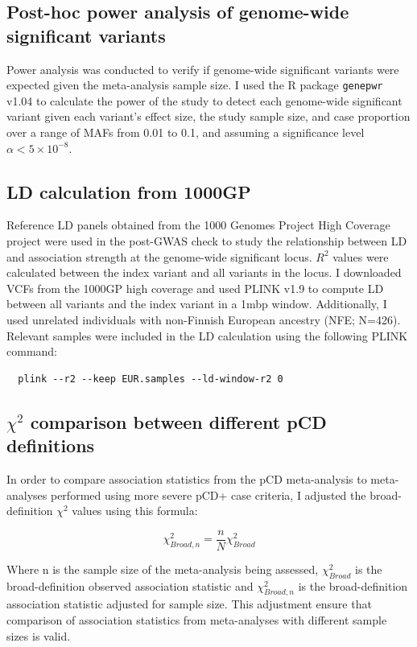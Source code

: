 \subsection{Post-hoc power analysis of genome-wide significant variants}
Power analysis was conducted to verify if genome-wide significant variants were expected given the meta-analysis sample size. I used the R package \Verb+genepwr+ v1.04 \cite{genepwr-docs} to calculate the power of the study to detect each genome-wide significant variant given each variant's effect size, the study sample size, and case proportion over a range of MAFs from 0.01 to 0.1, and assuming a significance level $\alpha < 5\times10^{-8}$.


\subsection{LD calculation from 1000GP}
Reference LD panels obtained from the 1000 Genomes Project High Coverage project \cite{1000gphc} were used in the post-GWAS check to study the relationship between LD and association strength at the genome-wide significant locus. $R^{2}$ values were calculated between the index variant and all variants in the locus. I downloaded VCFs from the 1000GP high coverage and used PLINK v1.9 to compute LD between all variants and the index variant in a 1mbp window. Additionally, I used unrelated individuals with non-Finnish European ancestry (NFE; N=426). Relevant samples were included in the LD calculation using the following PLINK command:
\begin{verbatim}
  plink --r2 --keep EUR.samples --ld-window-r2 0 
\end{verbatim}

\subsection{$\chi^{2}$ comparison between different pCD definitions}
In order to compare association statistics from the pCD meta-analysis to meta-analyses performed using more severe pCD+ case criteria, I adjusted the broad-definition $\chi^{2}$ values using this formula:

 $$\chi^{2}_{Broad,n}=\frac{n}{N}\chi^{2}_{Broad}$$

Where n is the sample size of the meta-analysis being assessed, $\chi^{2}_{Broad}$ is the broad-definition observed association statistic and  $\chi^{2}_{Broad,n}$ is the broad-definition association statistic adjusted for sample size. This adjustment ensure that comparison of association statistics from meta-analyses with different sample sizes is valid.

